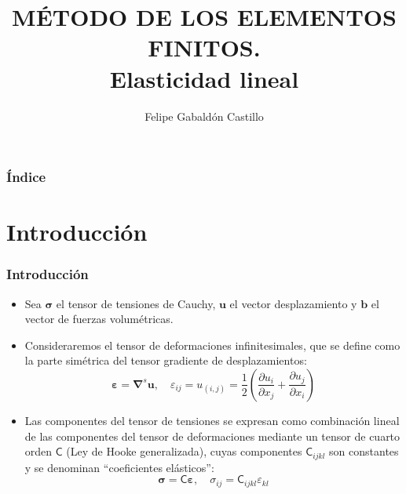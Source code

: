 \documentclass{beamer}
\title[Elasticidad lineal]{
MÉTODO DE LOS ELEMENTOS FINITOS. \\
Elasticidad lineal}
\author[F. Gabaldón]{Felipe Gabaldón Castillo}
\date{}
\begin{document}
\begin{frame}
\titlepage
\end{frame}
\begin{frame}
\frametitle{Índice}
\tableofcontents
\end{frame}
\section{Introducción}
\begin{frame}
\frametitle{Introducción}
\begin{itemize}
\item Sea $\bm{\sigma}$ el tensor de tensiones
de Cauchy, $\bm{u}$ el vector desplazamiento y $\bm{b}$ el vector de
fuerzas volumétricas.
\item Consideraremos el tensor de deformaciones infinitesimales, que se define
como la parte simétrica del tensor gradiente de desplazamientos:
\begin{equation}
\bm{\varepsilon}=\bm{\nabla}^s \bm{u}, \quad
\varepsilon_{ij}=u_{(i,j)}=\frac{1}{2}\left(
\frac{\partial u_i}{\partial x_j}+
\frac{\partial u_j}{\partial x_i}
\right)
\end{equation}
\item Las componentes del tensor de
tensiones se expresan como combinación lineal de las componentes del tensor
de deformaciones mediante un tensor de cuarto orden
$\boldsymbol{\mathsf{C}}$ (Ley de Hooke generalizada), cuyas
componentes $\mathsf{C}_{ijkl}$
son constantes y se denominan ``coeficientes elásticos'':
\begin{equation}
\bm{\sigma}= \boldsymbol{\mathsf{C}} \bm{\varepsilon} , \quad
\sigma_{ij}=\mathsf{C}_{ijkl} \varepsilon_{kl} \label{hookegen}
\end{equation}
\end{itemize}
\end{frame}
\end{document}
